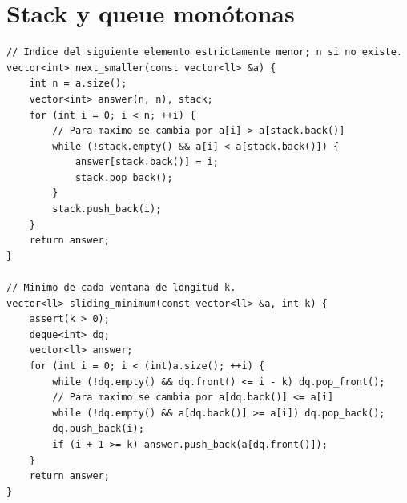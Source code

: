 \section{Stack y queue mon\'otonas}

\begin{lstlisting}[style=cpp]
// Indice del siguiente elemento estrictamente menor; n si no existe.
vector<int> next_smaller(const vector<ll> &a) {
    int n = a.size();
    vector<int> answer(n, n), stack;
    for (int i = 0; i < n; ++i) {
        // Para maximo se cambia por a[i] > a[stack.back()]
        while (!stack.empty() && a[i] < a[stack.back()]) {
            answer[stack.back()] = i;
            stack.pop_back();
        }
        stack.push_back(i);
    }
    return answer;
}

// Minimo de cada ventana de longitud k.
vector<ll> sliding_minimum(const vector<ll> &a, int k) {
    assert(k > 0);
    deque<int> dq;
    vector<ll> answer;
    for (int i = 0; i < (int)a.size(); ++i) {
        while (!dq.empty() && dq.front() <= i - k) dq.pop_front();
        // Para maximo se cambia por a[dq.back()] <= a[i]
        while (!dq.empty() && a[dq.back()] >= a[i]) dq.pop_back();
        dq.push_back(i);
        if (i + 1 >= k) answer.push_back(a[dq.front()]);
    }
    return answer;
}
\end{lstlisting}

